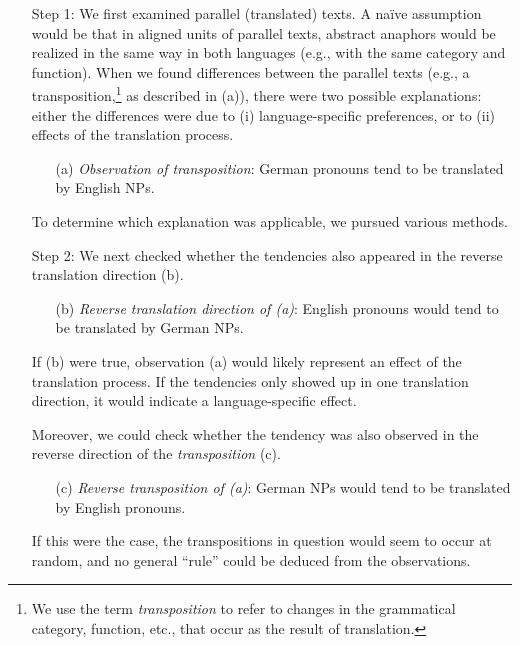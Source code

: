 \documentclass[output=paper]{LSP/langsci}
\begin{document}
\begin{enumerate}
\item[Step] 1: We first examined parallel (translated) texts. A na\"ive assumption would be that in aligned units of parallel texts, abstract anaphors would be realized in the same way in both languages (e.g., with the same category and function). When we found differences between the parallel texts (e.g., a transposition,\footnote{%
We use the term \emph{transposition} to refer to changes in the grammatical category, function, etc., that occur as the result of  translation.} %
 as described in (a)), there were two possible explanations: either the differences were due to (i) language-specific preferences, or to (ii) effects of the translation process. 
 
 \begin{itemize}
\item[(a)]  \emph{Observation of transposition}:  German pronouns tend to be translated by English NPs.
\end{itemize}

To determine which explanation was applicable, we pursued various methods. 

\item[Step] 2: We next checked whether the tendencies also appeared in the reverse translation direction (b).

\begin{itemize}
\item[(b)]  \emph{Reverse translation direction of (a)}:  English pronouns would tend to be translated by German NPs.
\end{itemize}

 If (b) were true, observation (a) would likely represent an effect of the translation process. If the tendencies only showed up in one translation direction, it would indicate a language-specific effect.

Moreover, we could check whether the tendency was also observed  in the reverse direction of the \emph{transposition} (c).
\begin{itemize}
\item[(c)]  \emph{Reverse transposition of (a)}:  German NPs would tend to be translated by English pronouns.
\end{itemize}

If this were the case, the transpositions in question would  seem to occur at random, and no general ``rule'' could be deduced from the observations. 



\end{enumerate}
\end{document}
